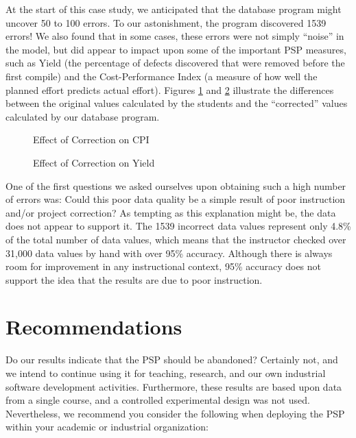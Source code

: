 At the start of this case study, we anticipated that the database program
might uncover 50 to 100 errors. To our astonishment, the program discovered
1539 errors!  We also found that in some cases, these errors were not
simply ``noise'' in the model, but did appear to impact upon some of the
important PSP measures, such as Yield (the percentage of defects discovered
that were removed before the first compile) and the Cost-Performance Index
(a measure of how well the planned effort predicts actual effort).
Figures \ref{compareCPI} and \ref{compareYield} illustrate the differences
between the original values calculated by the students and the
``corrected'' values calculated by our database program.

  \begin{figure} [tp]
    {\centerline{}}
    \caption{\label{compareCPI}Effect of Correction on CPI}
  \end{figure}

  \begin{figure} [tp]
    {\centerline{}}
    \caption{\label{compareYield}Effect of Correction on Yield}
\end{figure}
  
One of the first questions we asked ourselves upon obtaining such a high
number of errors was: Could this poor data quality be a simple result of
poor instruction and/or project correction?  As tempting as this
explanation might be, the data does not appear to support it.  The 1539
incorrect data values represent only 4.8\% of the total number of data
values, which means that the instructor checked over 31,000 data values by
hand with over 95\% accuracy.  Although there is always room for
improvement in any instructional context, 95\% accuracy does not support
the idea that the results are due to poor instruction.


\section{Recommendations}

Do our results indicate that the PSP should be abandoned?  Certainly not,
and we intend to continue using it for teaching, research, and our own
industrial software development activities. Furthermore, these results are
based upon data from a single course, and a controlled experimental design
was not used.  Nevertheless, we recommend you consider the following
when deploying the PSP within your academic or industrial organization:

